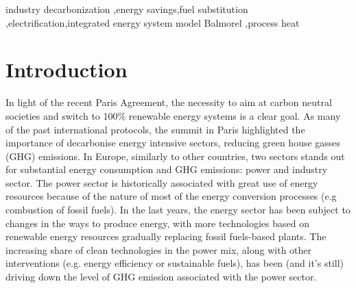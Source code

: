 \documentclass[review]{elsarticle}
\begin{document}
\begin{frontmatter}
\begin{abstract}
\end{abstract}

\begin{keyword}
industry decarbonization \sep energy savings\sep fuel substitution \sep electrification\sep integrated energy system model Balmorel \sep process heat
\end{keyword}

\end{frontmatter}

\linenumbers


\section{Introduction}
In light of the recent Paris Agreement, the necessity to aim at carbon neutral societies and switch to 100\% renewable energy systems is a clear goal. 
As many of the past international protocols, the summit in Paris highlighted the importance of decarbonise energy intensive sectors, reducing green house gasses (GHG) emissions. 
In Europe, similarly to other countries, two sectors stands out for substantial energy consumption and GHG emissions: power and industry sector. 
The power sector is historically associated with great use of energy resources because of the nature of most of the energy conversion processes (e.g combustion of fossil fuels). In the last years, the energy sector has been subject to changes in the ways to produce energy, with more technologies based on renewable energy resources gradually replacing fossil fuels-based plants. The increasing share of clean technologies in the power mix, along with other interventions (e.g. energy efficiency or sustainable fuels), has been (and it's still) driving down the level of GHG emission associated with the power sector.
\end{document}
